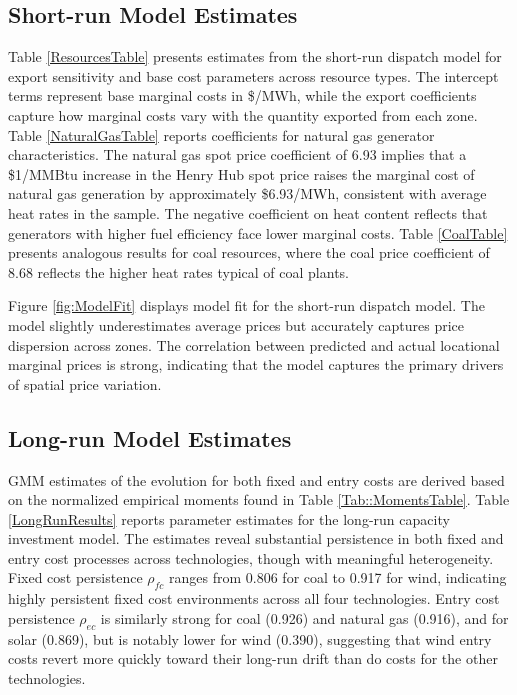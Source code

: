 \documentclass[12pt]{article}
\begin{document}
\subsection{Short-run Model Estimates}

Table \ref{ResourcesTable} presents estimates from the short-run dispatch model for export sensitivity and base cost parameters across resource types. The intercept terms represent base marginal costs in \$/MWh, while the export coefficients capture how marginal costs vary with the quantity exported from each zone. Table \ref{NaturalGasTable} reports coefficients for natural gas generator characteristics. The natural gas spot price coefficient of 6.93 implies that a \$1/MMBtu increase in the Henry Hub spot price raises the marginal cost of natural gas generation by approximately \$6.93/MWh, consistent with average heat rates in the sample. The negative coefficient on heat content reflects that generators with higher fuel efficiency face lower marginal costs. Table \ref{CoalTable} presents analogous results for coal resources, where the coal price coefficient of 8.68 reflects the higher heat rates typical of coal plants.

Figure \ref{fig:ModelFit} displays model fit for the short-run dispatch model. The model slightly underestimates average prices but accurately captures price dispersion across zones. The correlation between predicted and actual locational marginal prices is strong, indicating that the model captures the primary drivers of spatial price variation.

\subsection{Long-run Model Estimates}

GMM estimates of the evolution for both fixed and entry costs are derived based on the normalized empirical moments found in Table \ref{Tab::MomentsTable}. Table \ref{LongRunResults} reports parameter estimates for the long-run capacity investment model. The estimates reveal substantial persistence in both fixed and entry cost processes across technologies, though with meaningful heterogeneity. Fixed cost persistence $\rho_{fc}$ ranges from 0.806 for coal to 0.917 for wind, indicating highly persistent fixed cost environments across all four technologies. Entry cost persistence $\rho_{ec}$ is similarly strong for coal (0.926) and natural gas (0.916), and for solar (0.869), but is notably lower for wind (0.390), suggesting that wind entry costs revert more quickly toward their long-run drift than do costs for the other technologies.
\end{document}
